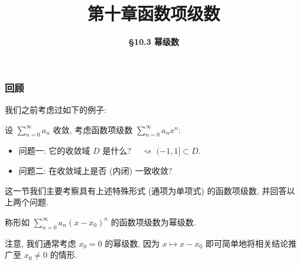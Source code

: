 \everymath{\displaystyle}



\title[第十章\\
函数项级数]{\texorpdfstring{\LARGE \bfseries 第十章\quad 函数项级数}{第十章 函数项级数}} %
\author[\smaller \S 10.3\\
幂级数] %
{\Large \bfseries \S 10.3 幂级数}
\date{}





\begin{frame}

\titlepage %

\end{frame}



\begin{frame}
\frametitle{回顾}

我们之前考虑过如下的例子:

设 $\displaystyle \sum_{n=0}^{\infty} a_n$ 收敛, 考虑函数项级数 $\displaystyle \sum_{n=0}^{\infty} a_n x^n:$

\begin{itemize}
\item 问题一: 它的收敛域 $D$ 是什么? \pause ~ $\rightsquigarrow$ $(-1, 1] \subset D.$
\pause
\item 问题二: 在收敛域上是否 (内闭) 一致收敛?
\end{itemize}

\pause
\vspace{1em}

这一节我们主要考察具有上述特殊形式 (通项为单项式) 的函数项级数, 并回答以上两个问题.

\pause

\begin{Def}[幂级数]
称形如 $\displaystyle \sum_{n=0}^{\infty} a_n (x - x_0)^n$ 的函数项级数为幂级数.
\end{Def}

\alert{注意}, 我们通常考虑 $x_0 = 0$ 的幂级数, 因为 $x \mapsto x - x_0$ 即可简单地将相关结论推广至 $x_0 \neq 0$ 的情形.

\end{frame}

